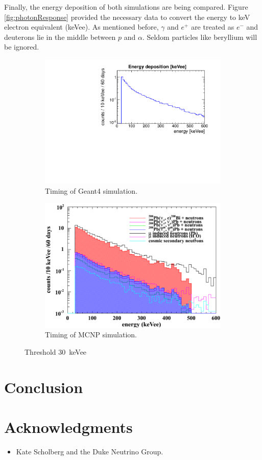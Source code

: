 \documentclass[12pt]{article}
\begin{document}
Finally, the energy deposition of both simulations are being compared. Figure \ref{fig:photonResponse} provided the necessary data to convert the energy to keV electron equivalent (keVee). As mentioned before, $\gamma$ and $e^+$ are treated as $e^-$ and deuterons lie in the middle between $p$ and $\alpha$. Seldom particles like beryllium will be ignored.

 \begin{figure}[H]
 	\begin{subfigure}[t]{0.49\textwidth}
 		\includegraphics[trim = 0cm 0cm 0cm 1.15cm, clip, width=\textwidth]{pics/edep.pdf}
 		\caption{Timing of Geant4 simulation.}
 	\end{subfigure}
 	\begin{subfigure}[t]{0.49\textwidth}
 		\includegraphics[trim = 0cm 0cm 0cm 1.15cm, clip,width=\textwidth]{pics/edep_MCNP.pdf}
 		\caption{Timing of MCNP simulation.}
 	\end{subfigure}
 	\caption{Threshold \SI{30}{keVee}}
 	\label{fig:edep30}
 \end{figure}
 
\section{Conclusion}


\section*{Acknowledgments}
\begin{itemize}
  \item[] Kate Scholberg and the Duke Neutrino Group.
\end{itemize}



\end{document}
